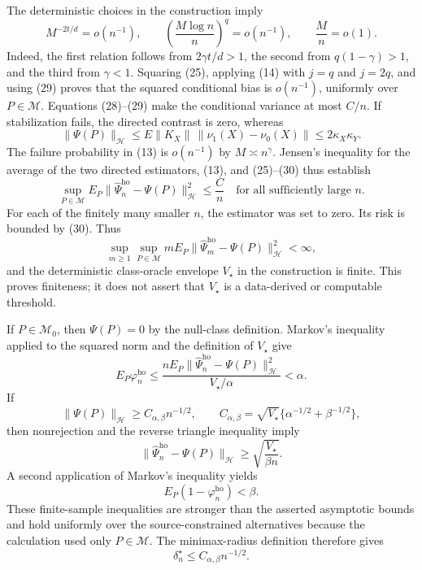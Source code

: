 The deterministic choices in the construction imply
\[
 M^{-2t/d}=o(n^{-1}),
 \qquad
 \left(\frac{M\log n}{n}\right)^q=o(n^{-1}),
 \qquad
 \frac{M}{n}=o(1).
 \tag{29}
\]
Indeed, the first relation follows from \(2\gamma t/d>1\), the second from \(q(1-\gamma)>1\), and the third from \(\gamma<1\).  Squaring (25), applying (14) with \(j=q\) and \(j=2q\), and using (29) proves that the squared conditional bias is \(o(n^{-1})\), uniformly over \(P\in\mathcal M\).  Equations (28)--(29) make the conditional variance at most \(C/n\).  If stabilization fails, the directed contrast is zero, whereas
\[
 \|\Psi(P)\|_{\mathcal H}
 \leq E\|K_X\|\,\|\nu_1(X)-\nu_0(X)\|
 \leq2\kappa_X\kappa_Y.
 \tag{30}
\]
The failure probability in (13) is \(o(n^{-1})\) by \(M\asymp n^\gamma\).  Jensen's inequality for the average of the two directed estimators, (13), and (25)--(30) thus establish
\[
 \sup_{P\in\mathcal M}
 E_P\|\widehat\Psi_n^{\mathrm{ho}}-\Psi(P)\|_{\mathcal H}^2
 \leq\frac{C}{n}
 \quad\text{for all sufficiently large }n.
 \tag{31}
\]
For each of the finitely many smaller \(n\), the estimator was set to zero.  Its risk is bounded by (30).  Thus
\[
 \sup_{m\geq1}\sup_{P\in\mathcal M}
 mE_P\|\widehat\Psi_m^{\mathrm{ho}}-\Psi(P)\|_{\mathcal H}^2<\infty,
 \tag{32}
\]
and the deterministic class-oracle envelope \(V_\star\) in the construction is finite.  This proves finiteness; it does not assert that \(V_\star\) is a data-derived or computable threshold.

If \(P\in\mathcal M_0\), then \(\Psi(P)=0\) by the null-class definition.  Markov's inequality applied to the squared norm and the definition of \(V_\star\) give
\[
 E_P\varphi_n^{\mathrm{ho}}
 \leq
 \frac{nE_P\|\widehat\Psi_n^{\mathrm{ho}}-\Psi(P)\|_{\mathcal H}^2}
      {V_\star/\alpha}
 <\alpha.
 \tag{33}
\]
If
\[
 \|\Psi(P)\|_{\mathcal H}
 \geq C_{\alpha,\beta}n^{-1/2},
 \qquad
 C_{\alpha,\beta}
 =\sqrt{V_\star}\{\alpha^{-1/2}+\beta^{-1/2}\},
 \tag{34}
\]
then nonrejection and the reverse triangle inequality imply
\[
 \|\widehat\Psi_n^{\mathrm{ho}}-\Psi(P)\|_{\mathcal H}
 \geq\sqrt{\frac{V_\star}{\beta n}}.
\]
A second application of Markov's inequality yields
\[
 E_P(1-\varphi_n^{\mathrm{ho}})<\beta.
 \tag{35}
\]
These finite-sample inequalities are stronger than the asserted asymptotic bounds and hold uniformly over the source-constrained alternatives because the calculation used only \(P\in\mathcal M\).  The minimax-radius definition therefore gives
\[
 \delta_n^\star\leq C_{\alpha,\beta}n^{-1/2}.
 \tag{36}
\]

